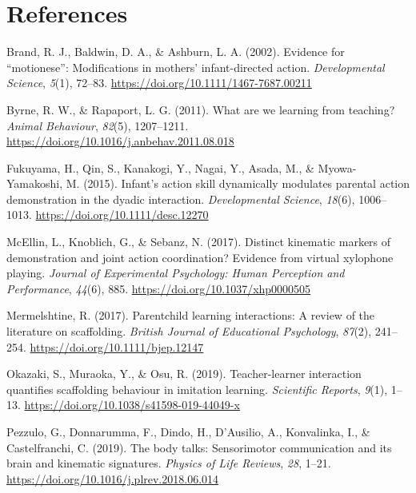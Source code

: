 \documentclass[
  man,floatsintext]{apa6}
\newlength{\cslhangindent}
\newlength{\cslentryspacingunit} %
\newenvironment{CSLReferences}[2] %
 {%
  \setlength{\parindent}{0pt}
  \ifodd #1
  \let\oldpar\par
  \def\par{\hangindent=\cslhangindent\oldpar}
  \fi
  \setlength{\parskip}{#2\cslentryspacingunit}
 }%
 {}
\begin{document}
\clearpage

\hypertarget{references}{%
\section{References}\label{references}}

\begingroup
\setlength{\parindent}{-0in}
\setlength{\leftskip}{0in}

\hypertarget{refs}{}
\begin{CSLReferences}{1}{0}
\leavevmode{}%
Brand, R. J., Baldwin, D. A., \& Ashburn, L. A. (2002). Evidence for {``motionese''}: Modifications in mothers' infant-directed action. \emph{Developmental Science}, \emph{5}(1), 72--83. \url{https://doi.org/10.1111/1467-7687.00211}

\leavevmode{}%
Byrne, R. W., \& Rapaport, L. G. (2011). What are we learning from teaching? \emph{Animal Behaviour}, \emph{82}(5), 1207--1211. \url{https://doi.org/10.1016/j.anbehav.2011.08.018}

\leavevmode{}%
Fukuyama, H., Qin, S., Kanakogi, Y., Nagai, Y., Asada, M., \& Myowa-Yamakoshi, M. (2015). Infant's action skill dynamically modulates parental action demonstration in the dyadic interaction. \emph{Developmental Science}, \emph{18}(6), 1006--1013. \url{https://doi.org/10.1111/desc.12270}

\leavevmode{}%
McEllin, L., Knoblich, G., \& Sebanz, N. (2017). Distinct kinematic markers of demonstration and joint action coordination? {Evidence} from virtual xylophone playing. \emph{Journal of Experimental Psychology: Human Perception and Performance}, \emph{44}(6), 885. \url{https://doi.org/10.1037/xhp0000505}

\leavevmode{}%
Mermelshtine, R. (2017). Parent\textendash child learning interactions: {A} review of the literature on scaffolding. \emph{British Journal of Educational Psychology}, \emph{87}(2), 241--254. \url{https://doi.org/10.1111/bjep.12147}

\leavevmode{}%
Okazaki, S., Muraoka, Y., \& Osu, R. (2019). Teacher-learner interaction quantifies scaffolding behaviour in imitation learning. \emph{Scientific Reports}, \emph{9}(1), 1--13. \url{https://doi.org/10.1038/s41598-019-44049-x}

\leavevmode{}%
Pezzulo, G., Donnarumma, F., Dindo, H., D'Ausilio, A., Konvalinka, I., \& Castelfranchi, C. (2019). The body talks: {Sensorimotor} communication and its brain and kinematic signatures. \emph{Physics of Life Reviews}, \emph{28}, 1--21. \url{https://doi.org/10.1016/j.plrev.2018.06.014}


\end{CSLReferences}
\end{document}
